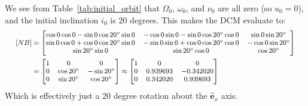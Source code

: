 \documentclass[titlepage]{article}
\begin{document}
We see from Table~\ref{tab:initial_orbit} that $\Omega_0$, $\omega_0$, and $\nu_0$ are all zero (so $u_0=0$), and the initial inclination $i_0$ is $20$ degrees. This makes the DCM evaluate to:
\begin{equation}
	\footnotesize
	\begin{split}
		[NB]&=
		\begin{bmatrix}
			\cos{0}\cos{0}-\sin{0}\cos{20^\circ}\sin{0} & -\cos{0}\sin{0}-\sin{0}\cos{20^\circ}\cos{0} & \sin{0}\sin{20^\circ}\\
			\sin{0}\cos{0}+\cos{0}\cos{20^\circ}\sin{0} & -\sin{0}\sin{0}+\cos{0}\cos{20^\circ}\cos{0} & -\cos{0}\sin{20^\circ}\\
			\sin{20^\circ}\sin{0} & \sin{20^\circ}\cos{0} & \cos{20^\circ}
		\end{bmatrix} \\
		&=
		\begin{bmatrix}
			1 & 0 & 0 \\
			0 & \cos 20^\circ & -\sin 20^\circ \\
			0 & \sin 20^\circ & \cos 20^\circ
		\end{bmatrix}
		\approx
		\begin{bmatrix}
			1 & 0 & 0 \\
			0 & 0.939693 & -0.342020 \\
			0 & 0.342020 & 0.939693
		\end{bmatrix}
	\end{split}
	\normalsize
\end{equation}
Which is effectively just a 20 degree rotation about the $\hat{\boldsymbol{e}}_x$ axis.\\
\end{document}
